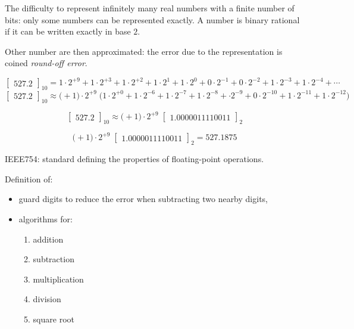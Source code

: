 \documentclass{article}
\begin{document}
The difficulty to represent infinitely many real numbers with a finite number of bits: only some numbers can be represented exactly.
A number is binary rational if it can be written exactly in base $2$.

Other number are then approximated: the error due to the representation is coined \textit{round-off error}.

\begin{equation*}
\begin{bmatrix}527.2\end{bmatrix}_{10} = 1\cdot 2^{+9} + 1\cdot 2^{+3} + 1\cdot 2^{+2} + 1\cdot 2^{1} + 1\cdot 2^{0} + 0\cdot 2^{-1} + 0\cdot 2^{-2} + 1\cdot 2^{-3}+ 1\cdot 2^{-4} + \cdots
\end{equation*}
\begin{equation*}
\begin{bmatrix}527.2\end{bmatrix}_{10} \approx \bigl(+1\bigr)\cdot 2^{+9}\;\bigl(1\cdot 2^{+0} + 1\cdot 2^{-6} + 1\cdot 2^{-7} + 1\cdot 2^{-8} + \cdot 2^{-9} + 0\cdot 2^{-10} + 1\cdot 2^{-11}+ 1\cdot 2^{-12}\bigr)
\end{equation*}

\begin{equation*}
\begin{bmatrix}527.2\end{bmatrix}_{10} \approx \bigl(+1\bigr)\cdot 2^{+9}\;\begin{bmatrix}1.0000011110011\end{bmatrix}_{2}
\end{equation*}

\begin{equation*}
\bigl(+1\bigr)\cdot 2^{+9}\;\begin{bmatrix}1.0000011110011\end{bmatrix}_{2} = 527.1875
\end{equation*}


IEEE754: standard defining the properties of floating-point operations.

Definition of:
\begin{itemize}
\item guard digits to reduce the error when subtracting two nearby digits,
\item algorithms for:
\begin{enumerate}
\item addition
\item subtraction
\item multiplication
\item division
\item square root
\end{enumerate}
\end{itemize}
\end{document}
